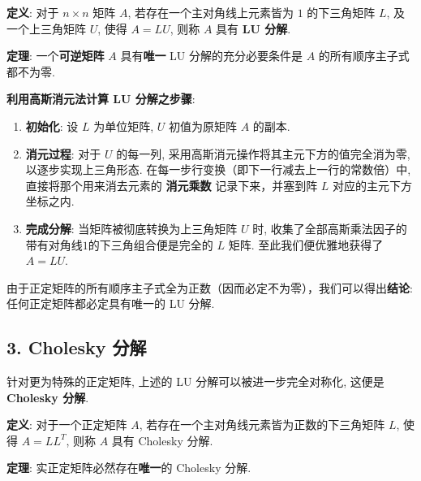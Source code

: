 \documentclass{ctexart}
\begin{document}
\textbf{定义}: 对于 $n \times n$ 矩阵 $A$, 若存在一个主对角线上元素皆为 $1$ 的下三角矩阵 $L$, 及一个上三角矩阵 $U$, 使得 $A = LU$, 则称 $A$ 具有 \textbf{LU 分解}.

\textbf{定理}: 一个\textbf{可逆矩阵} $A$ 具有\textbf{唯一} LU 分解的充分必要条件是 $A$ 的所有顺序主子式都不为零.

\textbf{利用高斯消元法计算 LU 分解之步骤}:
\begin{enumerate}
    \item \textbf{初始化}: 设 $L$ 为单位矩阵, $U$ 初值为原矩阵 $A$ 的副本.
    \item \textbf{消元过程}: 对于 $U$ 的每一列, 采用高斯消元操作将其主元下方的值完全消为零, 以逐步实现上三角形态. 在每一步行变换（即下一行减去上一行的常数倍）中, 直接将那个用来消去元素的 \textbf{消元乘数} 记录下来，并塞到阵 $L$ 对应的主元下方坐标之内.
    \item \textbf{完成分解}: 当矩阵被彻底转换为上三角矩阵 $U$ 时, 收集了全部高斯乘法因子的带有对角线$1$的下三角组合便是完全的 $L$ 矩阵. 至此我们便优雅地获得了 $A = LU$.
\end{enumerate}

由于正定矩阵的所有顺序主子式全为正数（因而必定不为零），我们可以得出\textbf{结论}: 任何正定矩阵都必定具有唯一的 LU 分解.

\subsection{3. Cholesky 分解}

针对更为特殊的正定矩阵, 上述的 LU 分解可以被进一步完全对称化, 这便是 \textbf{Cholesky 分解}.

\textbf{定义}: 对于一个正定矩阵 $A$, 若存在一个主对角线元素皆为正数的下三角矩阵 $L$, 使得 $A = LL^T$, 则称 $A$ 具有 Cholesky 分解.

\textbf{定理}: 实正定矩阵必然存在\textbf{唯一}的 Cholesky 分解.
\end{document}
